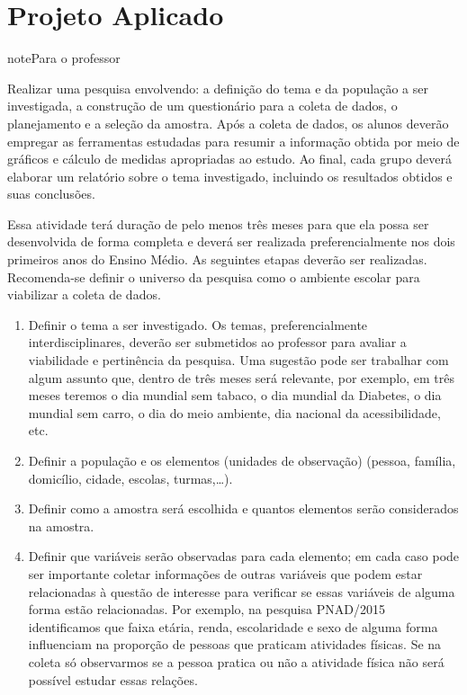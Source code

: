 \section{Projeto Aplicado}
\label{\detokenize{PE103-A:projeto}}\label{\detokenize{PE103-A:id1}}
\begin{sphinxadmonition}{note}{Para o professor}


Realizar uma pesquisa envolvendo: a definição do tema e da população a ser investigada, a construção de um questionário para a coleta de dados, o planejamento e a seleção da amostra.
Após a coleta de dados, os alunos deverão empregar as ferramentas estudadas para resumir a informação obtida por meio de gráficos e cálculo de medidas apropriadas ao estudo. Ao final, cada grupo deverá elaborar um relatório sobre o tema investigado, incluindo os resultados obtidos e suas conclusões.


Essa atividade terá duração de pelo menos três meses para que ela possa ser desenvolvida de forma completa e deverá ser realizada preferencialmente nos dois primeiros anos do Ensino Médio. As seguintes etapas deverão ser realizadas. Recomenda-se definir o universo da pesquisa como o ambiente escolar para viabilizar a coleta de dados.
\begin{enumerate}
\item {} 
Definir o tema a ser investigado.  Os temas, preferencialmente interdisciplinares, deverão ser submetidos ao professor para avaliar a viabilidade e pertinência da pesquisa. Uma sugestão pode ser trabalhar com algum assunto que, dentro de três meses será relevante, por exemplo, em três meses teremos o dia mundial sem tabaco, o dia mundial da Diabetes, o dia mundial sem carro, o dia do meio ambiente, dia nacional da acessibilidade, etc.

\item {} 
Definir a população e os elementos (unidades de observação) (pessoa, família, domicílio, cidade, escolas, turmas,…).

\item {} 
Definir como a amostra será escolhida e quantos elementos serão considerados na amostra.

\item {} 
Definir que variáveis serão observadas para cada elemento; em cada caso pode ser importante coletar informações de outras variáveis que podem estar relacionadas à questão de interesse para verificar se essas variáveis de alguma forma estão relacionadas. Por exemplo, na pesquisa PNAD/2015 identificamos que faixa etária, renda, escolaridade e sexo de alguma forma influenciam na proporção de pessoas que praticam atividades físicas. Se na coleta só observarmos se a pessoa pratica ou não a atividade física não será possível estudar essas relações.


\end{enumerate}
\end{sphinxadmonition}
